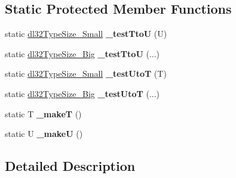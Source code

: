 \subsection*{Static Protected Member Functions}
\begin{DoxyCompactItemize}
\item 
\hypertarget{classdl32_type_checking_helper_a23355f2171a549548f2561ddefedb519}{static \hyperlink{classdl32_type_checking_helper_aaf5aef650f2cd1d9267758bb505134ba}{dl32\-Type\-Size\-\_\-\-Small} {\bfseries \-\_\-test\-Tto\-U} (U)}\label{classdl32_type_checking_helper_a23355f2171a549548f2561ddefedb519}

\item 
\hypertarget{classdl32_type_checking_helper_ad740b5511ebb79fd37ed87b616c2ac82}{static \hyperlink{classdl32_type_checking_helper_1_1dl32_type_size___big}{dl32\-Type\-Size\-\_\-\-Big} {\bfseries \-\_\-test\-Tto\-U} (...)}\label{classdl32_type_checking_helper_ad740b5511ebb79fd37ed87b616c2ac82}

\item 
\hypertarget{classdl32_type_checking_helper_aa7ac92aecafce7f28e93f63905453184}{static \hyperlink{classdl32_type_checking_helper_aaf5aef650f2cd1d9267758bb505134ba}{dl32\-Type\-Size\-\_\-\-Small} {\bfseries \-\_\-test\-Uto\-T} (T)}\label{classdl32_type_checking_helper_aa7ac92aecafce7f28e93f63905453184}

\item 
\hypertarget{classdl32_type_checking_helper_a129c669f3dc15dcdd08c0f8ff8118bf2}{static \hyperlink{classdl32_type_checking_helper_1_1dl32_type_size___big}{dl32\-Type\-Size\-\_\-\-Big} {\bfseries \-\_\-test\-Uto\-T} (...)}\label{classdl32_type_checking_helper_a129c669f3dc15dcdd08c0f8ff8118bf2}

\item 
\hypertarget{classdl32_type_checking_helper_ac6f66b6b1a664f5a0f78bda4a7850b4e}{static T {\bfseries \-\_\-make\-T} ()}\label{classdl32_type_checking_helper_ac6f66b6b1a664f5a0f78bda4a7850b4e}

\item 
\hypertarget{classdl32_type_checking_helper_a0a3678242c90ce8af20b8be8617337e5}{static U {\bfseries \-\_\-make\-U} ()}\label{classdl32_type_checking_helper_a0a3678242c90ce8af20b8be8617337e5}

\end{DoxyCompactItemize}


\subsection{Detailed Description}
